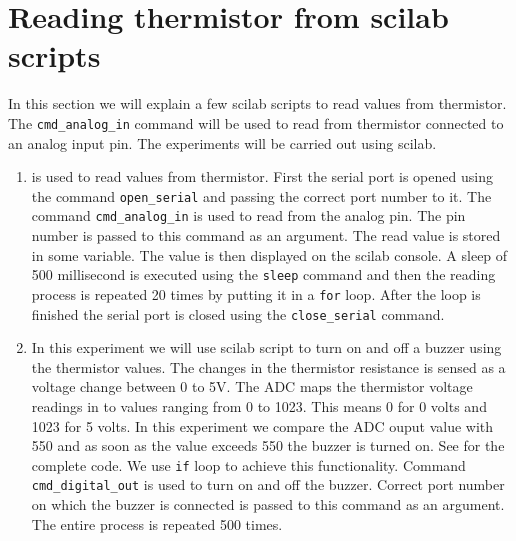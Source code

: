 \section {Reading thermistor from scilab scripts}
In this section we will explain a few scilab scripts to read values from thermistor. The {\tt cmd\_analog\_in} command will be used to read from thermistor connected to an analog input pin. The experiments will be carried out using scilab.

\begin{enumerate}
\item {} is used to read values from thermistor. First the serial port is opened using the command {\tt open\_serial} and passing the correct port number to it. The command {\tt cmd\_analog\_in} is used to read from the analog pin. The pin number is passed to this command as an argument. The read value is stored in some variable. The value is then displayed on the scilab console. A sleep of 500 millisecond is executed using the {\tt sleep} command and then the reading process is repeated 20 times by putting it in a {\tt for} loop. After the loop is finished the serial port is closed using the {\tt close\_serial} command.


\item In this experiment we will use scilab script to turn on and off a buzzer using the thermistor values. The changes in the thermistor resistance is sensed as a voltage change between 0 to 5V. The ADC maps the thermistor voltage readings in to values ranging from 0 to 1023. This means 0 for 0 volts and 1023 for 5 volts. In this experiment we compare the ADC ouput value with 550 and as soon as the value exceeds 550 the buzzer is turned on. See   for the complete code. We use {\tt if} loop to achieve this functionality. Command {\tt cmd\_digital\_out} is used to turn on and off the buzzer. Correct port number on which the buzzer is connected is passed to this command as an argument. The entire process is repeated 500 times.



\end{enumerate}
